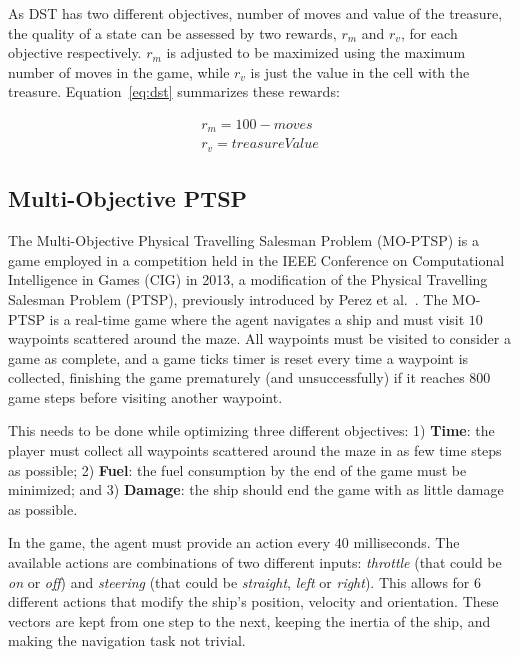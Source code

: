 \documentclass[journal]{IEEEtran}
\begin{document}
As DST has two different objectives, number of moves and value of the treasure, the quality of a state can be assessed by two rewards, $r_m$ and $r_v$, for each objective respectively. $r_m$ is adjusted to be maximized using the maximum number of moves in the game, while $r_v$ is just the value in the cell with the treasure. Equation~\ref{eq:dst} summarizes these rewards:

\begin{equation}	\label{eq:dst}
\begin{split}
r_m = 100 - moves \\
r_v = treasureValue
\end{split}
\end{equation}


\subsection{Multi-Objective PTSP} \label{ssec:moptsp}

The Multi-Objective Physical Travelling Salesman Problem (MO-PTSP) is a game employed in a competition held in the IEEE Conference on Computational Intelligence in Games (CIG) in 2013, a modification of the Physical Travelling Salesman Problem (PTSP), previously introduced by Perez et al.~\cite{PerezCEC2012}. The MO-PTSP is a real-time game where the agent navigates a ship and must visit $10$ waypoints scattered around the maze. All waypoints must be visited to consider a game as complete, and a game ticks timer is reset every time a waypoint is collected, finishing the game prematurely (and unsuccessfully) if it reaches $800$ game steps before visiting another waypoint.

This needs to be done while optimizing three different objectives:  1) \textbf{Time}: the player must collect all waypoints scattered around the maze in as few time steps as possible; 2) \textbf{Fuel}: the fuel consumption by the end of the game must be minimized; and 3) \textbf{Damage}: the ship should end the game with as little damage as possible.

In the game, the agent must provide an action every $40$ milliseconds. The available actions are combinations of two different inputs: \textit{throttle} (that could be \textit{on} or \textit{off}) and \textit{steering} (that could be \textit{straight}, \textit{left} or \textit{right}). This allows for $6$ different actions that modify the ship's position, velocity and orientation. These vectors are kept from one step to the next, keeping the inertia of the ship, and making the navigation task not trivial. 
\end{document}
